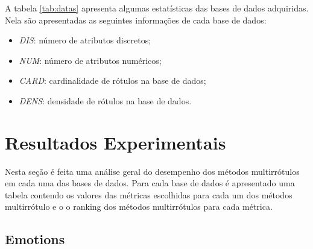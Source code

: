 A tabela \ref{tab:datas} apresenta algumas estatísticas das bases de dados adquiridas.
Nela são apresentadas as seguintes informações de cada base de dados:
\begin{itemize}
  \item \textit{DIS}: número de atributos discretos;
  \item \textit{NUM}: número de atributos numéricos;
  \item \textit{CARD}: cardinalidade de rótulos na base de dados;
  \item \textit{DENS}: densidade de rótulos na base de dados.
\end{itemize}




% 


\section{Resultados Experimentais}
Nesta seção é feita uma análise geral do desempenho dos métodos multirrótulos em cada uma das bases de dados.
Para cada base de dados é apresentado uma tabela
contendo os valores das métricas escolhidas para cada um dos métodos multirrótulo e o
o ranking dos métodos multirrótulos para cada métrica.

\subsection{Emotions}

